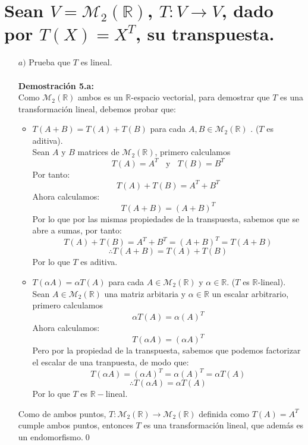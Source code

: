 \section{Sean $V = \mathcal{M}_2(\mathbb{R})$, $T:V\longrightarrow V$, dado por $T(X) = X^T$, su transpuesta.}
\begin{itemize}
    \item [$a)$] Prueba que $T$ es lineal.\\\\
    \textbf{Demostraci\'on 5.a:}\\
    Como $\mathcal{M}_2(\mathbb{R})$ ambos es un $\mathbb{R}$-espacio vectorial, para demostrar que $T$ es una transformaci\'on lineal, debemos probar que:
\begin{itemize}
    \item $T(A+B) = T(A) + T(B)$ para cada $A,B \in \mathcal{M}_2(\mathbb{R})$ . ($T$ es aditiva).\\
    Sean $A$ y $B$ matrices de $\mathcal{M}_2(\mathbb{R})$, primero calculamos \[T(A)=A^T~~~~\text{y}~~~~T(B)=B^T\]
    Por tanto:
    \[T(A)+T(B)=A^T+B^T\]
    Ahora calculamos:
    \[T(A+B)=(A+B)^T\]
    Por lo que por las mismas propiedades de la transpuesta, sabemos que se abre a sumas, por tanto:
    \[T(A)+T(B)=A^T+B^T=(A+B)^T=T(A+B)\]
    \[\therefore T(A+B) = T(A) + T(B)\]
    Por lo que $T$ es aditiva.
    
 \item  $T(\alpha A) = \alpha T(A)$ para cada $A \in \mathcal{M}_2(\mathbb{R})$ y $\alpha \in \mathbb{R}$. ($T$ es $\mathbb{R}$-lineal).\\
 Sean $A\in \mathcal{M}_2(\mathbb{R})$ una matriz arbitaria y $\alpha\in \mathbb{R}$ un escalar arbitrario, primero calculamos \[\alpha T(A)=\alpha (A)^T\]
    Ahora calculamos:
    \[T(\alpha A)=(\alpha A)^T\]
    Pero por la propiedad de la transpuesta, sabemos que podemos factorizar el escalar de una tranpuesta, de modo que:
    \[T(\alpha A) =(\alpha A)^T=\alpha(A)^T=\alpha T(A)\]
    \[\therefore T(\alpha A) =\alpha T(A)\]
    Por lo que $T$ es $\mathbb{R}-$lineal.

\end{itemize}
Como de ambos puntos, $T: \mathcal{M}_2(\mathbb{R}) \rightarrow \mathcal{M}_2(\mathbb{R})$ definida como $T(A)=A^T$ cumple ambos puntos, entonces $T$ es una transformaci\'on lineal, que adem\'as es un endomorfismo.\qed
    

\end{itemize}
